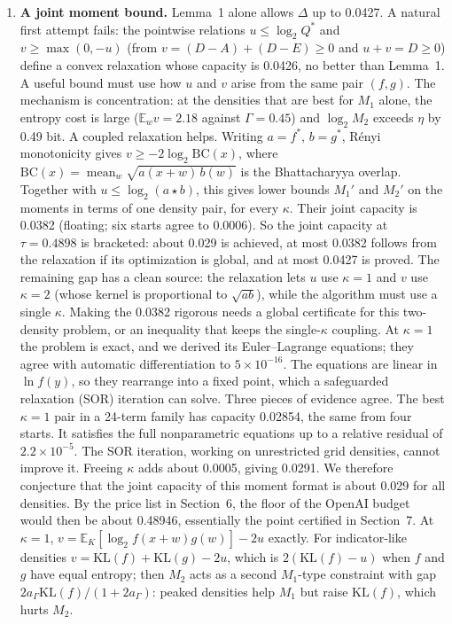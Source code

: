 \documentclass[11pt]{article}
\DeclareMathOperator{\mean}{mean}
\newcommand{\E}{\mathbb{E}}
\newcommand{\KL}{\mathrm{KL}}
\theoremstyle{plain}
\begin{document}
\begin{enumerate}
\item \textbf{A joint moment bound.} Lemma~1 alone allows $\Delta$ up to 0.0427. A natural first attempt fails: the pointwise relations $u \le \log_2 Q^*$ and $v \ge \max(0, -u)$ (from $v = (D-A) + (D-E) \ge 0$ and $u + v = D \ge 0$) define a convex relaxation whose capacity is 0.0426, no better than Lemma~1. A useful bound must use how $u$ and $v$ arise from the same pair $(f, g)$. The mechanism is concentration: at the densities that are best for $M_1$ alone, the entropy cost is large ($\E_w v = 2.18$ against $\Gamma = 0.45$) and $\log_2 M_2$ exceeds $\eta$ by 0.49 bit. A coupled relaxation helps. Writing $a = f^*$, $b = g^*$, R\'enyi monotonicity gives $v \ge -2 \log_2 \mathrm{BC}(x)$, where $\mathrm{BC}(x) = \mean_w \sqrt{a(x+w)\, b(w)}$ is the Bhattacharyya overlap. Together with $u \le \log_2 (a \star b)$, this gives lower bounds $M_1'$ and $M_2'$ on the moments in terms of one density pair, for every $\kappa$. Their joint capacity is 0.0382 (floating; six starts agree to 0.0006). So the joint capacity at $\tau = 0.4898$ is bracketed: about 0.029 is achieved, at most 0.0382 follows from the relaxation if its optimization is global, and at most 0.0427 is proved. The remaining gap has a clean source: the relaxation lets $u$ use $\kappa = 1$ and $v$ use $\kappa = 2$ (whose kernel is proportional to $\sqrt{ab}$), while the algorithm must use a single $\kappa$. Making the 0.0382 rigorous needs a global certificate for this two-density problem, or an inequality that keeps the single-$\kappa$ coupling. At $\kappa = 1$ the problem is exact, and we derived its Euler--Lagrange equations; they agree with automatic differentiation to $5\times10^{-16}$. The equations are linear in $\ln f(y)$, so they rearrange into a fixed point, which a safeguarded relaxation (SOR) iteration can solve. Three pieces of evidence agree. The best $\kappa = 1$ pair in a 24-term family has capacity 0.02854, the same from four starts. It satisfies the full nonparametric equations up to a relative residual of $2.2\times10^{-5}$. The SOR iteration, working on unrestricted grid densities, cannot improve it. Freeing $\kappa$ adds about 0.0005, giving 0.0291. We therefore conjecture that the joint capacity of this moment format is about 0.029 for all densities. By the price list in Section~6, the floor of the OpenAI budget would then be about 0.48946, essentially the point certified in Section~7. At $\kappa = 1$, $v = \E_K[\log_2 f(x+w)g(w)] - 2u$ exactly. For indicator-like densities $v = \KL(f) + \KL(g) - 2u$, which is $2(\KL(f) - u)$ when $f$ and $g$ have equal entropy; then $M_2$ acts as a second $M_1$-type constraint with gap $2a_\Gamma \KL(f)/(1+2a_\Gamma)$: peaked densities help $M_1$ but raise $\KL(f)$, which hurts $M_2$.

\end{enumerate}
\end{document}
